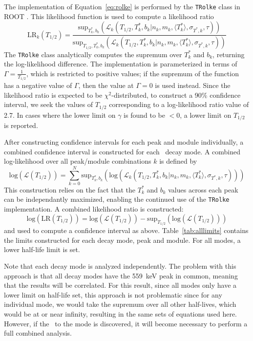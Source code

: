 \documentclass[/main.tex]{subfiles}
\begin{document}
The implementation of Equation~\ref{eq:rolke} is performed by the \texttt{TRolke} class in ROOT \cite{rolke2005}.
This likelihood function is used to compute a likelihood ratio
\begin{equation}
  \mathrm{LR}_k(T_{1/2}) = \frac{\mathrm{sup}_{T^*_k,b_k}\left(\mathcal{L}_k(T_{1/2},T^*_k,b_k|n_k,m_k,\langle T^*_k\rangle, \sigma_{T^*,k},\tau)\right)}{\mathrm{sup}_{T_{1/2},T^*_k,b_k}\left(\mathcal{L}_k(T_{1/2},T^*_k,b_k|n_k,m_k,\langle T^*_k\rangle, \sigma_{T^*,k},\tau)\right)}
\end{equation}
The \texttt{TRolke} class analytically computes the supremum over $T^*_k$ and $b_k$, returning the log-likelihood difference.
The implementation is parameterized in terms of $\Gamma=\frac{1}{T_{1/2}}$, which is restricted to positive values; if the supremum of the function has a negative value of $\Gamma$, then the value at $\Gamma=0$ is used instead.
Since the likelihood ratio is expected to be $\chi^2$-distributed, to construct a 90\% confidence interval, we seek the values of $T_{1/2}$ corresponding to a log-likelihood ratio value of 2.7.
In cases where the lower limit on $\gamma$ is found to be $<0$, a lower limit on $T_{1/2}$ is reported.

After constructing confidence intervals for each peak and module individually, a combined confidence interval is constructed for each \bbes\ decay mode.
A combined log-likelihood over all peak/module combinations $k$ is defined by
\begin{equation}
  \mathrm{log}\left(\mathcal{L}(T_{1/2})\right) = \sum_{k=0}^{N} \mathrm{sup}_{T^*_k,b_k}\left(\mathrm{log}\left(\mathcal{L}_k(T_{1/2},T^*_k,b_k|n_k,m_k,\langle T^*_k\rangle, \sigma_{T^*,k},\tau)\right)\right)
\end{equation}
This construction relies on the fact that the $T^*_k$ and $b_k$ values across each peak can be independantly maximized, enabling the continued use of the \texttt{TRolke} implementation.
A combined likelihood ratio is constructed:
\begin{equation}
  \mathrm{log}\left(\mathrm{LR}(T_{1/2})\right)=\mathrm{log}\left(\mathcal{L}(T_{1/2})\right) - \mathrm{sup}_{T_{1/2}}\left(\mathrm{log}\left(\mathcal{L}(T_{1/2})\right)\right)
\end{equation}
and used to compute a confidence interval as above.
Table~\ref{tab:alllimits} contains the limits constructed for each decay mode, peak and module.
For all modes, a lower half-life limit is set.

Note that each decay mode is analyzed independently.
The problem with this approach is that all decay modes have the 559~keV peak in common, meaning that the results will be correlated.
For this result, since all modes only have a lower limit on half-life set, this approach is not problematic since for any individual mode, we would take the supremum over all other half-lives, which would be at or near infinity, resulting in the same sets of equations used here.
However, if the \bbes\ to the  mode is discovered, it will become necessary to perform a full combined analysis.
\end{document}
